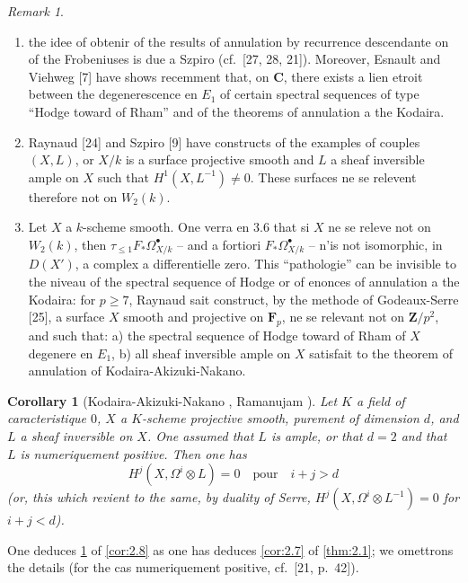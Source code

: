\documentclass[12pt,a4paper]{article}
\theoremstyle{plain}
\newtheorem{corollary}[theorem]{Corollary}
\theoremstyle{definition}
\theoremstyle{remark}
\newtheorem{remark}[theorem]{Remark}
\begin{document}
\begin{remark}\label{rem:2.10}
\begin{enumerate}[label=(\roman*)]
\item the idee of obtenir of the results of annulation by recurrence descendante on of the Frobeniuses is due a Szpiro (cf.~[27, 28, 21]). Moreover, Esnault and Viehweg [7] have shows recemment that, on $\mathbf{C}$, there exists a lien etroit between the degenerescence en $E_1$ of certain spectral sequences of type ``Hodge toward of Rham'' and of the theorems of annulation a the Kodaira.

\item Raynaud [24] and Szpiro [9] have constructs of the examples of couples $(X, L)$, or $X/k$ is a surface projective smooth and $L$ a sheaf inversible ample on $X$ such that $H^1(X, L^{-1}) \neq 0$. These surfaces ne se relevent therefore not on $W_2(k)$.

\item Let $X$ a $k$-scheme smooth. One verra en 3.6 that si $X$ ne se releve not on $W_2(k)$, then $\tau_{\le 1} F_* \Omega^{\bullet}_{X/k}$ -- and a fortiori $F_* \Omega^{\bullet}_{X/k}$ -- n'is not isomorphic, in $D(X')$, a complex a differentielle zero. This ``pathologie'' can be invisible to the niveau of the spectral sequence of Hodge or of enonces of annulation a the Kodaira: for $p \ge 7$, Raynaud sait construct, by the methode of Godeaux-Serre [25], a surface $X$ smooth and projective on $\mathbf{F}_p$, ne se relevant not on $\mathbf{Z}/p^2$, and such that: a) the spectral sequence of Hodge toward of Rham of $X$ degenere en $E_1$, b) all sheaf inversible ample on $X$ satisfait to the theorem of annulation of Kodaira-Akizuki-Nakano.
\end{enumerate}
\end{remark}

\begin{corollary}[Kodaira-Akizuki-Nakano {\cite{1,18}}, Ramanujam {\cite{23}}]\label{cor:2.11}
Let $K$ a field of caracteristique $0$, $X$ a $K$-scheme projective smooth, purement of dimension $d$, and $L$ a sheaf inversible on $X$. One assumed that $L$ is ample, or that $d = 2$ and that $L$ is numeriquement positive. Then one has
\[
H^j(X, \Omega^i \otimes L) = 0 \quad \text{pour} \quad i + j > d
\]
(or, this which revient to the same, by duality of Serre, $H^j(X, \Omega^i \otimes L^{-1}) = 0$ for $i + j < d$).
\end{corollary}

One deduces \ref{cor:2.11} of \ref{cor:2.8} as one has deduces \ref{cor:2.7} of \ref{thm:2.1}; we omettrons the details (for the cas numeriquement positive, cf.~[21, p.~42]).
\end{document}
